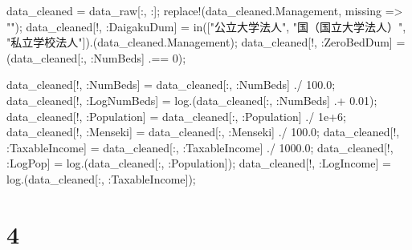 \documentclass[
  letterpaper,
  DIV=11,
  numbers=noendperiod]{scrreprt}
\newenvironment{Shaded}{\begin{snugshade}}{\end{snugshade}}
\newcommand{\ConstantTok}[1]{\textcolor[rgb]{0.56,0.35,0.01}{#1}}
\newcommand{\FloatTok}[1]{\textcolor[rgb]{0.68,0.00,0.00}{#1}}
\newcommand{\FunctionTok}[1]{\textcolor[rgb]{0.28,0.35,0.67}{#1}}
\newcommand{\NormalTok}[1]{\textcolor[rgb]{0.00,0.23,0.31}{#1}}
\newcommand{\OperatorTok}[1]{\textcolor[rgb]{0.37,0.37,0.37}{#1}}
\newcommand{\StringTok}[1]{\textcolor[rgb]{0.13,0.47,0.30}{#1}}
\begin{document}
\begin{Shaded}
\begin{Highlighting}[]
\NormalTok{data\_cleaned }\OperatorTok{=}\NormalTok{ data\_raw[}\OperatorTok{:}\NormalTok{, }\OperatorTok{:}\NormalTok{];}
\FunctionTok{replace!}\NormalTok{(data\_cleaned.Management, }\ConstantTok{missing} \OperatorTok{=\textgreater{}} \StringTok{""}\NormalTok{);}
\NormalTok{data\_cleaned[!, }\OperatorTok{:}\NormalTok{DaigakuDum] }\OperatorTok{=} \FunctionTok{in}\NormalTok{([}\StringTok{"公立大学法人"}\NormalTok{, }\StringTok{"国（国立大学法人）"}\NormalTok{, }\StringTok{"私立学校法人"}\NormalTok{]).(data\_cleaned.Management);}
\NormalTok{data\_cleaned[!, }\OperatorTok{:}\NormalTok{ZeroBedDum] }\OperatorTok{=}\NormalTok{ (data\_cleaned[}\OperatorTok{:}\NormalTok{, }\OperatorTok{:}\NormalTok{NumBeds] }\OperatorTok{.==} \FloatTok{0}\NormalTok{);}

\NormalTok{data\_cleaned[!, }\OperatorTok{:}\NormalTok{NumBeds] }\OperatorTok{=}\NormalTok{ data\_cleaned[}\OperatorTok{:}\NormalTok{, }\OperatorTok{:}\NormalTok{NumBeds] }\OperatorTok{./} \FloatTok{100.0}\NormalTok{;}
\NormalTok{data\_cleaned[!, }\OperatorTok{:}\NormalTok{LogNumBeds] }\OperatorTok{=} \FunctionTok{log}\NormalTok{.(data\_cleaned[}\OperatorTok{:}\NormalTok{, }\OperatorTok{:}\NormalTok{NumBeds] }\OperatorTok{.+} \FloatTok{0.01}\NormalTok{);}
\NormalTok{data\_cleaned[!, }\OperatorTok{:}\NormalTok{Population] }\OperatorTok{=}\NormalTok{ data\_cleaned[}\OperatorTok{:}\NormalTok{, }\OperatorTok{:}\NormalTok{Population] }\OperatorTok{./} \FloatTok{1e+6}\NormalTok{;}
\NormalTok{data\_cleaned[!, }\OperatorTok{:}\NormalTok{Menseki] }\OperatorTok{=}\NormalTok{ data\_cleaned[}\OperatorTok{:}\NormalTok{, }\OperatorTok{:}\NormalTok{Menseki] }\OperatorTok{./} \FloatTok{100.0}\NormalTok{;}
\NormalTok{data\_cleaned[!, }\OperatorTok{:}\NormalTok{TaxableIncome] }\OperatorTok{=}\NormalTok{ data\_cleaned[}\OperatorTok{:}\NormalTok{, }\OperatorTok{:}\NormalTok{TaxableIncome] }\OperatorTok{./} \FloatTok{1000.0}\NormalTok{;}
\NormalTok{data\_cleaned[!, }\OperatorTok{:}\NormalTok{LogPop] }\OperatorTok{=} \FunctionTok{log}\NormalTok{.(data\_cleaned[}\OperatorTok{:}\NormalTok{, }\OperatorTok{:}\NormalTok{Population]);}
\NormalTok{data\_cleaned[!, }\OperatorTok{:}\NormalTok{LogIncome] }\OperatorTok{=} \FunctionTok{log}\NormalTok{.(data\_cleaned[}\OperatorTok{:}\NormalTok{, }\OperatorTok{:}\NormalTok{TaxableIncome]);}
\end{Highlighting}
\end{Shaded}

\hypertarget{section-23}{%
\section{4}\label{section-23}}
\end{document}
